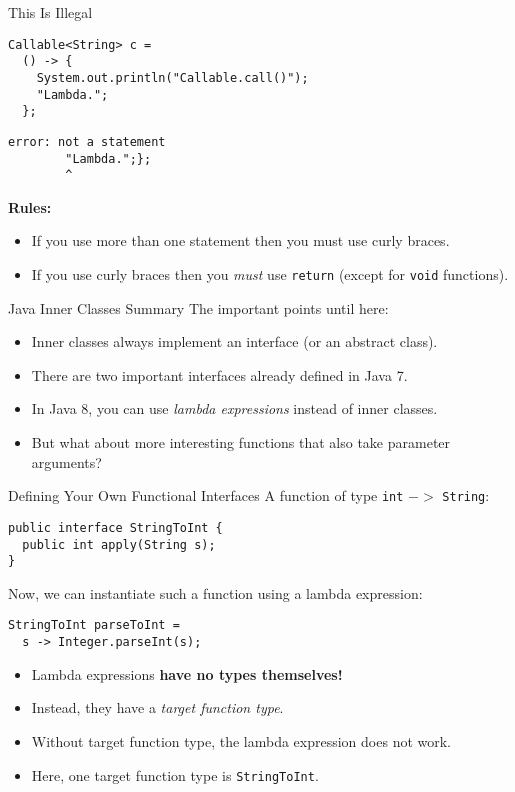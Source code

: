 \documentclass{beamer}
\begin{document}
\begin{frame}[fragile]{This Is Illegal}
\begin{lstlisting}
Callable<String> c =
  () -> {
    System.out.println("Callable.call()");
    "Lambda.";
  };
\end{lstlisting}

\pause{}

{\color{red!70!black}
\begin{verbatim}
error: not a statement
        "Lambda.";};
        ^
\end{verbatim}}

\pause{}

\textbf{Rules:}
\begin{itemize}
  \pause{} \item If you use more than one statement then you must use curly braces.
  \pause{} \item If you use curly braces then you \emph{must} use \lstinline{return} (except for \lstinline{void} functions).
\end{itemize}
\end{frame}

\begin{frame}{Java Inner Classes Summary}
The important points until here:

\begin{itemize}
\pause{} \item Inner classes always implement an interface (or an abstract class).
\pause{} \item There are two important interfaces already defined in Java 7.
\pause{} \item In Java 8, you can use \emph{lambda expressions} instead of inner classes.
\pause{} \item But what about more interesting functions that also take parameter arguments?
\end{itemize}
\end{frame}

\begin{frame}[fragile]{Defining Your Own Functional Interfaces}
A function of type \lstinline{int} $->$ \lstinline{String}:
\begin{lstlisting}
public interface StringToInt {
  public int apply(String s);
}
\end{lstlisting}

\pause{} Now, we can instantiate such a function using a lambda expression:
\begin{lstlisting}
StringToInt parseToInt =
  s -> Integer.parseInt(s);
\end{lstlisting}

\begin{itemize}
\pause{} \item Lambda expressions \textbf{have no types themselves!}
\pause{} \item Instead, they have a \emph{target function type}.
\pause{} \item Without target function type, the lambda expression does not work.
\pause{} \item Here, one target function type is \lstinline{StringToInt}.
\end{itemize}
\end{frame}
\end{document}
